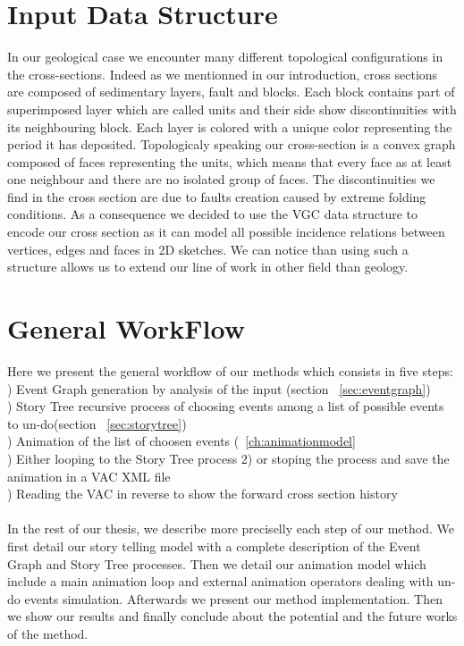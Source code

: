 \documentclass[12pt, a4paper]{report} %
\begin{document}
\section{Input Data Structure}
In our geological case we encounter many different topological configurations in the cross-sections. Indeed as we mentionned in our introduction, cross sections are composed of sedimentary layers, fault and blocks. Each block contains part of superimposed layer which are called units and their side show discontinuities with its neighbouring block. Each layer is colored with a unique color representing the period it has deposited. Topologicaly speaking our cross-section is a convex graph composed of faces representing the units, which means that every face as at least one neighbour and there are no isolated group of faces. The discontinuities we find in the cross section are due to faults creation caused by extreme folding conditions. As a consequence we decided to use the VGC \cite{vgc} data structure to encode our cross section as it can model all possible incidence relations between vertices, edges and faces in 2D sketches. We can notice than using such a structure allows us to extend our line of work in other field than geology.

\section{General WorkFlow}

Here we present the general workflow  of our methods which consists in five steps:\\

) Event Graph generation by analysis of the input (section ~\ref{sec:eventgraph})\\
) Story Tree recursive process of choosing events among a list of possible events to un-do(section ~\ref{sec:storytree})\\
) Animation of the list of choosen events (~\ref{ch:animationmodel}\\
) Either looping to the Story Tree process 2) or stoping the process and save the animation in a VAC XML file\cite{vac} \\
) Reading the VAC in reverse to show the forward cross section history
\\\\
In the rest of our thesis, we describe more preciselly each step of our method. We first detail our story telling model with a complete description of the Event Graph and Story Tree processes. Then we detail our animation model  which include a main animation loop and external animation operators dealing with un-do events simulation. Afterwards we present our method implementation. Then we show our results and finally conclude about the potential and the future works of the method. 
\end{document}
